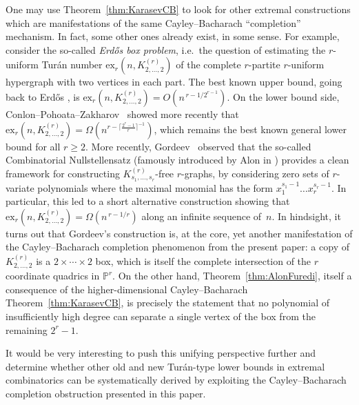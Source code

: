\documentclass[11pt]{article}
\theoremstyle{definition}
\theoremstyle{remark}
\newcommand{\PP}{\mathbb{P}}
\begin{document}
One may use Theorem~\ref{thm:KarasevCB} to look for other extremal constructions which are manifestations of the same Cayley--Bacharach ``completion'' mechanism. In fact, some other ones already exist, in some sense. For example, consider the so-called \emph{Erd\H{o}s box problem}, i.e.\ the question of estimating the $r$-uniform Tur\'an number $\mathrm{ex}_r(n, K^{(r)}_{2,\dots,2})$ of the complete $r$-partite $r$-uniform hypergraph with two vertices in each part. The best known upper bound, going back to Erd\H{o}s \cite{Erdos64}, is $\mathrm{ex}_r(n, K^{(r)}_{2,\dots,2}) = O\left(n^{\,r - 1/2^{r-1}}\right)$.
On the lower bound side, Conlon--Pohoata--Zakharov~\cite{CPZBox} showed more recently that $\mathrm{ex}_r(n, K^{(r)}_{2,\dots,2}) = \Omega\left( n^{r - \lceil \frac{2^r-1}{r}\rceil^{-1}} \right)$, which remains the best known general lower bound for all $r \geq 2$. More recently, Gordeev~\cite{Gordeev} observed that the so-called Combinatorial Nullstellensatz (famously introduced by Alon in \cite{Alon1999}) provides a clean framework for constructing $K^{(r)}_{s_1,\dots,s_r}$-free $r$-graphs, by considering zero sets of $r$-variate polynomials where the maximal monomial has the form $x_{1}^{s_{1}-1}\ldots x_{r}^{s_{r}-1}$. In particular, this led to a short alternative construction showing that $\mathrm{ex}_r(n, K^{(r)}_{2,\dots,2})=\Omega(n^{\,r-1/r})$ along an infinite sequence of~$n$. In hindsight, it turns out that Gordeev's construction is, at the core, yet another manifestation of the Cayley--Bacharach completion phenomenon from the present paper: a copy of $K^{(r)}_{2,\dots,2}$ is a $2\times\cdots\times 2$ box, which is itself the complete intersection of the $r$ coordinate quadrics in $\PP^r$. On the other hand, Theorem~\ref{thm:AlonFuredi}, itself a consequence of the higher-dimensional Cayley--Bacharach Theorem~\ref{thm:KarasevCB}, is precisely the statement that no polynomial of insufficiently high degree can separate a single vertex of the box from the remaining $2^r-1$. 

It would be very interesting to push this unifying perspective further and determine whether other old and new Tur\'an-type lower bounds in extremal combinatorics can be systematically derived by exploiting the Cayley--Bacharach completion obstruction presented in this paper. 
\end{document}
